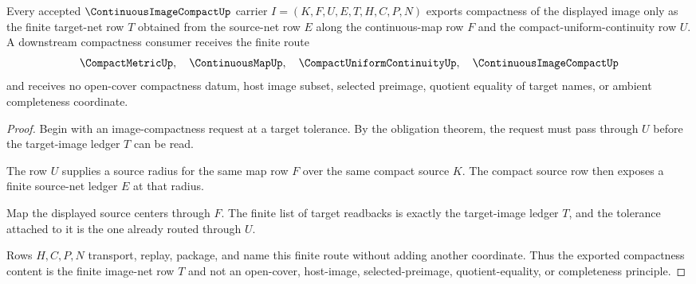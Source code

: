 \begin{theorem}
\label{thm:continuous-image-compact-finite-net-image}
Every accepted $\ContinuousImageCompactUp$ carrier $I=(K,F,U,E,T,H,C,P,N)$ exports compactness of the displayed image only as the finite target-net row $T$ obtained from the source-net row $E$ along the continuous-map row $F$ and the compact-uniform-continuity row $U$. A downstream compactness consumer receives the finite route
$$
\CompactMetricUp,\quad
\ContinuousMapUp,\quad
\CompactUniformContinuityUp,\quad
\ContinuousImageCompactUp
$$
and receives no open-cover compactness datum, host image subset, selected preimage, quotient equality of target names, or ambient completeness coordinate.
\end{theorem}
\begin{proof}
Begin with an image-compactness request at a target tolerance. By the obligation theorem, the request must pass through $U$ before the target-image ledger $T$ can be read.

The row $U$ supplies a source radius for the same map row $F$ over the same compact source $K$. The compact source row then exposes a finite source-net ledger $E$ at that radius.

Map the displayed source centers through $F$. The finite list of target readbacks is exactly the target-image ledger $T$, and the tolerance attached to it is the one already routed through $U$.

Rows $H,C,P,N$ transport, replay, package, and name this finite route without adding another coordinate. Thus the exported compactness content is the finite image-net row $T$ and not an open-cover, host-image, selected-preimage, quotient-equality, or completeness principle.
\end{proof}


\begin{closurestatus}{\ContinuousImageCompactUp}
  \theoryclosure{\seedClosure}
  \formalstatus{\unformalizedV}
\end{closurestatus}
